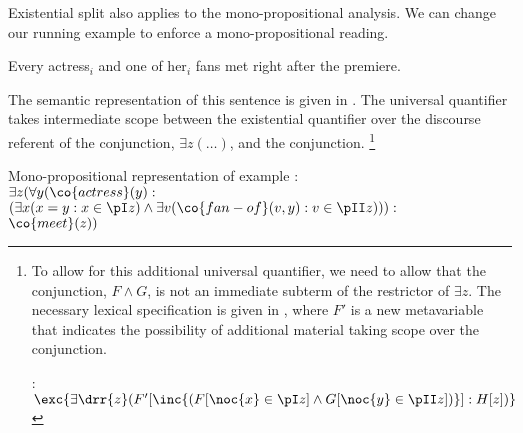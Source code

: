 \documentclass[output=paper]{langsci/langscibook}
\begin{document}
\bigskip%
\begin{sloppypar}
  Existential split also applies to the mono-propositional analysis.
  We can change our running example to enforce a mono-propositional
  reading.
\end{sloppypar}
\ea \label{ex-every-ana2}
Every actress$_i$ and one of her$_i$ fans met right after the premiere.
\z 

The semantic representation of this sentence is given in .
The universal quantifier takes intermediate scope between the existential quantifier over the discourse referent of the conjunction, $\exists z(\ldots)$, and the conjunction.%
\footnote{To allow for this additional universal quantifier, we need to allow that the conjunction, $F \land G$, is not an immediate subterm of the restrictor of $\exists z$.
The necessary lexical specification is given in , where $F'$ is a new metavariable that indicates the possibility of additional material taking scope over the conjunction.

\ea \label{le-mono-and-split}
: $\exc{\exists \drr{z} (F'[\inc{(F[\noc{x} \in \pI z]
\land G[\noc{y} \in \pII z])}]
: H[z])}$
\z 

}

\vbox{
\ea \label{mono-every-ana2}
Mono-propositional representation of example :\\[1ex]
$\exists z (
\forall y (\co{actress}(y) : $\\
\hspace*{\fill}$(\exists x (x = y : x \in \pI z)
\land
\exists v (\co{fan-of}(v,y) : v \in \pII z)
)) : \qquad\qquad$\\
\hspace*{\fill}$\co{meet}(z))$
\z 
}


\end{document}
